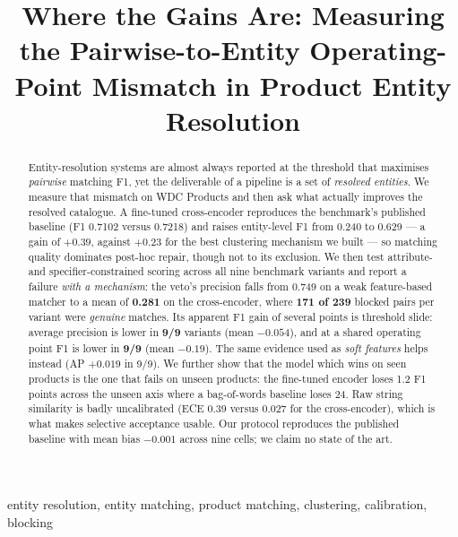 \documentclass[conference]{IEEEtran}
\begin{document}
\title{Where the Gains Are: Measuring the Pairwise-to-Entity Operating-Point
Mismatch in Product Entity Resolution}

\author{
}

\maketitle

\begin{abstract}
Entity-resolution systems are almost always reported at the threshold that maximises \emph{pairwise}
matching F1, yet the deliverable of a pipeline is a set of \emph{resolved entities}. We measure that
mismatch on WDC Products and then ask what actually improves the resolved catalogue. A fine-tuned
cross-encoder reproduces the benchmark's published baseline (F1 0.7102 versus 0.7218) and raises
entity-level F1 from 0.240 to 0.629 --- a gain of $+0.39$, against $+0.23$ for the best clustering
mechanism we built --- so matching quality dominates post-hoc repair, though not to its exclusion. We then
test attribute- and specifier-constrained scoring across all nine benchmark variants and report a failure
\emph{with a mechanism}: the veto's precision falls from 0.749 on a weak feature-based matcher to a mean of
\textbf{0.281} on the cross-encoder, where \textbf{171 of 239} blocked pairs per variant were \emph{genuine}
matches. Its apparent F1 gain of several points is threshold slide: average precision is lower in
\textbf{9/9} variants (mean $-0.054$), and at a shared operating point F1 is lower in \textbf{9/9}
(mean $-0.19$). The same evidence used as \emph{soft features} helps instead (AP $+0.019$ in 9/9). We
further show that the model which wins on seen products is the one that fails on unseen products: the
fine-tuned encoder loses 1.2 F1 points across the unseen axis where a bag-of-words baseline loses 24. Raw
string similarity is badly uncalibrated (ECE 0.39 versus 0.027 for the cross-encoder), which is what makes
selective acceptance usable. Our protocol reproduces the published baseline with mean bias $-0.001$ across
nine cells; we claim no state of the art.
\end{abstract}

\begin{IEEEkeywords}
entity resolution, entity matching, product matching, clustering, calibration, blocking
\end{IEEEkeywords}
\end{document}
